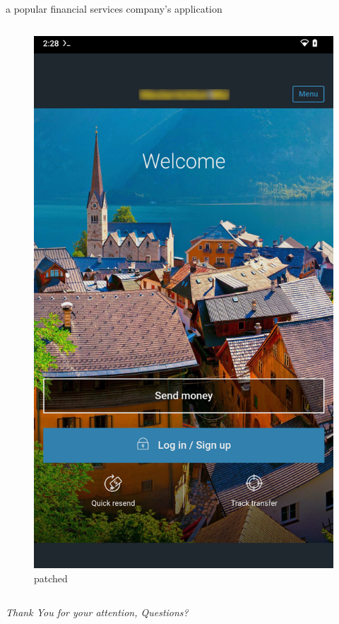 \documentclass{beamer}
\begin{document}
\begin{frame}[fragile]{a popular financial services company's application}
\begin{columns}
        \begin{figure}
            \centering
            \includegraphics[scale=0.07]{wu-patched.png}
            \caption{patched}
        \end{figure}
    \end{columns}
\end{frame}

\begin{frame}{}
    \centering \Huge
    \emph{Thank You for your attention, Questions?}
\end{frame}
\end{document}

